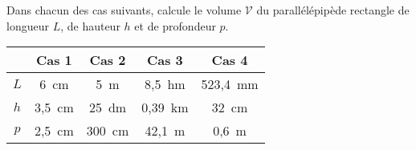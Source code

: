 Dans chacun des cas suivants, calcule le volume $\mathscr{V}$ du parallélépipède rectangle de longueur $L$, de hauteur $h$ et de profondeur $p$.
\begin{center}
  \begin{tabular}{|c|c|c|c|c|}
\cline{2-5}
\multicolumn{1}{c|}{}&Cas 1&Cas 2&Cas 3&Cas 4\\
\hline
$L$&6~cm&5~m&8,5~hm&523,4~mm\\
\hline
$h$&3,5~cm&25~dm&0,39~km&32~cm\\
\hline
$p$&2,5~cm&300~cm&42,1~m&0,6~m\\
\hline
  \end{tabular}
\end{center}
